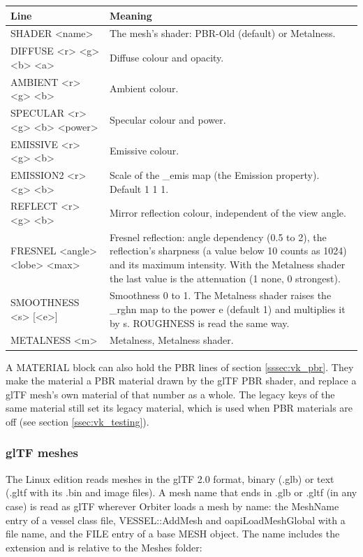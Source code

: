 \documentclass[Orbiter Developer Manual.tex]{subfiles}
\begin{document}
\begin{sloppypar}
	\begin{longtable}{ |>{\raggedright\arraybackslash}p{}|p{}| }
	\hline\rule{0pt}{2ex}
	\textbf{Line} & \textbf{Meaning}\\
	\hline\rule{0pt}{2ex}
	SHADER <name> & The mesh's shader: PBR-Old (default) or Metalness.\\
	\hline\rule{0pt}{2ex}
	DIFFUSE <r> <g> <b> <a> & Diffuse colour and opacity.\\
	\hline\rule{0pt}{2ex}
	AMBIENT <r> <g> <b> & Ambient colour.\\
	\hline\rule{0pt}{2ex}
	SPECULAR <r> <g> <b> <power> & Specular colour and power.\\
	\hline\rule{0pt}{2ex}
	EMISSIVE <r> <g> <b> & Emissive colour.\\
	\hline\rule{0pt}{2ex}
	EMISSION2 <r> <g> <b> & Scale of the \_emis map (the Emission property). Default 1 1 1.\\
	\hline\rule{0pt}{2ex}
	REFLECT <r> <g> <b> & Mirror reflection colour, independent of the view angle.\\
	\hline\rule{0pt}{2ex}
	FRESNEL <angle> <lobe> <max> & Fresnel reflection: angle dependency (0.5 to 2), the reflection's sharpness (a value below 10 counts as 1024) and its maximum intensity. With the Metalness shader the last value is the attenuation (1 none, 0 strongest).\\
	\hline\rule{0pt}{2ex}
	SMOOTHNESS <s> [<e>] & Smoothness 0 to 1. The Metalness shader raises the \_rghn map to the power e (default 1) and multiplies it by s. ROUGHNESS is read the same way.\\
	\hline\rule{0pt}{2ex}
	METALNESS <m> & Metalness, Metalness shader.\\
	\hline
	\end{longtable}

\noindent
A MATERIAL block can also hold the PBR lines of section \ref{sssec:vk_pbr}. They make the material a PBR material drawn by the glTF PBR shader, and replace a glTF mesh's own material of that number as a whole. The legacy keys of the same material still set its legacy material, which is used when PBR materials are off (see section \ref{ssec:vk_testing}).


\subsubsection{glTF meshes}
\label{sssec:vk_gltf}
The Linux edition reads meshes in the glTF 2.0 format, binary (.glb) or text (.gltf with its .bin and image files). A mesh name that ends in .glb or .gltf (in any case) is read as glTF wherever Orbiter loads a mesh by name: the MeshName entry of a vessel class file, VESSEL::AddMesh and oapiLoadMeshGlobal with a file name, and the FILE entry of a base MESH object. The name includes the extension and is relative to the Meshes folder:


\end{sloppypar}
\end{document}

